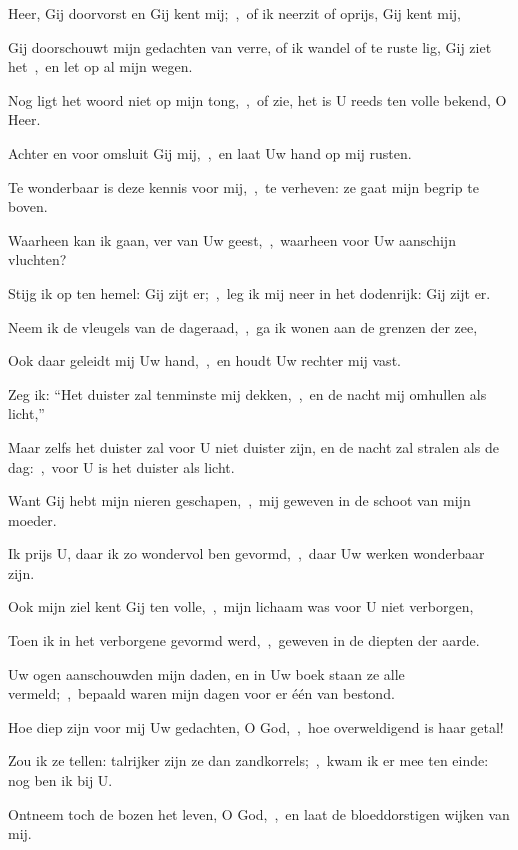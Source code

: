 \documentclass[12pt,twoside,a5paper]{article}
\begin{document}
\begin{halfparskip}
   Heer, Gij doorvorst en Gij kent mij;~\sep\ of ik neerzit of oprijs, Gij kent mij,


  Gij doorschouwt mijn gedachten van verre, of ik wandel of te ruste lig, Gij ziet het~\sep\ en let op al mijn wegen.

  Nog ligt het woord niet op mijn tong,~\sep\ of zie, het is U reeds ten volle bekend, O Heer.

  Achter en voor omsluit Gij mij,~\sep\ en laat Uw hand op mij rusten.

  Te wonderbaar is deze kennis voor mij,~\sep\ te verheven: ze gaat mijn begrip te boven.

  Waarheen kan ik gaan, ver van Uw geest,~\sep\ waarheen voor Uw aanschijn vluchten?

  Stijg ik op ten hemel: Gij zijt er;~\sep\ leg ik mij neer in het dodenrijk: Gij zijt er.

  Neem ik de vleugels van de dageraad,~\sep\ ga ik wonen aan de grenzen der zee,

  Ook daar geleidt mij Uw hand,~\sep\ en houdt Uw rechter mij vast.

  Zeg ik: ``Het duister zal tenminste mij dekken,~\sep\ en de nacht mij omhullen als licht,''

  Maar zelfs het duister zal voor U niet duister zijn, en de nacht zal stralen als de dag:~\sep\ voor U is het duister als licht.

  Want Gij hebt mijn nieren geschapen,~\sep\ mij geweven in de schoot van mijn moeder.

  Ik prijs U, daar ik zo wondervol ben gevormd,~\sep\ daar Uw werken wonderbaar zijn.

  Ook mijn ziel kent Gij ten volle,~\sep\ mijn lichaam was voor U niet verborgen,

  Toen ik in het verborgene gevormd werd,~\sep\ geweven in de diepten der aarde.

  Uw ogen aanschouwden mijn daden, en in Uw boek staan ze alle vermeld;~\sep\ bepaald waren mijn dagen voor er één van bestond.

  Hoe diep zijn voor mij Uw gedachten, O God,~\sep\ hoe overweldigend is haar getal!

  Zou ik ze tellen: talrijker zijn ze dan zandkorrels;~\sep\ kwam ik er mee ten einde: nog ben ik bij U.

  Ontneem toch de bozen het leven, O God,~\sep\ en laat de bloeddorstigen wijken van mij.


\end{halfparskip}
\end{document}
